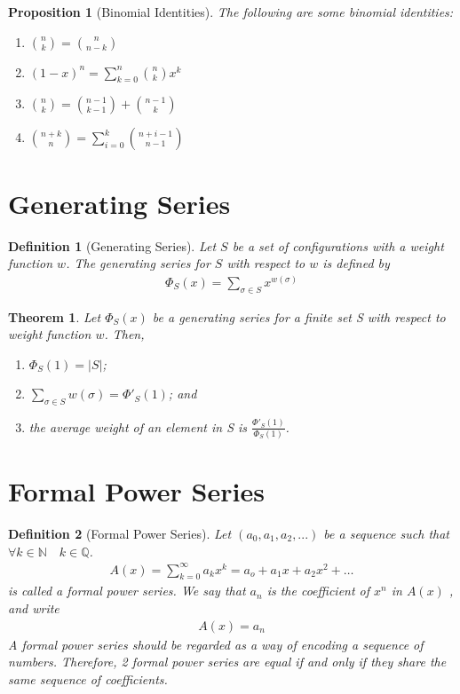 \documentclass[11pt, oneside]{book}
\theoremstyle{break}
\newtheorem{thm}{Theorem}[section]
\newtheorem{propo}{Proposition}[section]
\newtheorem{defn}{Definition}[section]
\newcommand{\bb}[1]{\mathbb{#1}}		%
\begin{document}
\begin{propo}[Binomial Identities]
	The following are some binomial identities:
	\begin{enumerate}
		\item $\binom{n}{k} = \binom{n}{n-k}$
		\item $(1-x)^n = \sum_{k=0}^{n}\binom{n}{k}x^k$
		\item $\binom{n}{k} = \binom{n-1}{k-1} + \binom{n-1}{k}$
		\item $\binom{n+k}{n} = \sum_{i=0}^{k}\binom{n+i-1}{n-1}$
	\end{enumerate}
\end{propo}


\section{Generating Series}

\begin{defn}[Generating Series]
	Let $S$ be a set of configurations with a weight function $w$. The generating series for $S$ with respect to $w$ is defined by
	\begin{gather*}
		\Phi_S(x) = \sum_{\sigma \in S}x^{w(\sigma)}
	\end{gather*}
\end{defn}

\begin{thm}
	Let $\Phi_S(x)$ be a generating series for a finite set S with respect to weight function $w$. Then,
	\begin{enumerate}
		\item $\Phi_S(1) = |S|$;
		\item $\sum_{\sigma \in S}w(\sigma) = \Phi'_S(1)$; and
		\item the average weight of an element in S is $\frac{\Phi'_S(1)}{\Phi_S(1)}$.
	\end{enumerate}
\end{thm}


\section{Formal Power Series}

\begin{defn}[Formal Power Series]
	Let $(a_0, a_1, a_2, ...)$ be a sequence such that $\forall k \in \bb{N} \quad k \in \bb{Q}$.\\
	\begin{gather*}
		A(x) = \sum_{k=0}^{\infty}a_kx^k =  a_o + a_1x + a_2x^2 + \hdots
	\end{gather*}
	is called a formal power series. We say that $a_n$ is the coefficient of $x^n$ in $A(x)$ , and write
	\begin{gather*}
		[x^n]A(x) = a_n
	\end{gather*}
	A formal power series should be regarded as a way of encoding a sequence of numbers. Therefore, 2 formal power series are equal if and only if they share the same sequence of coefficients.
\end{defn}
\end{document}
